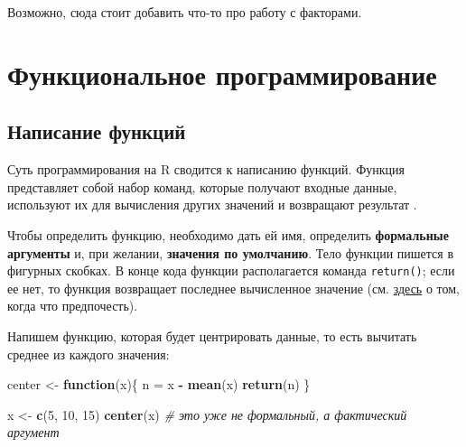 \documentclass[
]{book}
\newenvironment{Shaded}{\begin{snugshade}}{\end{snugshade}}
\newcommand{\CommentTok}[1]{\textcolor[rgb]{0.56,0.35,0.01}{\textit{#1}}}
\newcommand{\ControlFlowTok}[1]{\textcolor[rgb]{0.13,0.29,0.53}{\textbf{#1}}}
\newcommand{\DecValTok}[1]{\textcolor[rgb]{0.00,0.00,0.81}{#1}}
\newcommand{\FunctionTok}[1]{\textcolor[rgb]{0.13,0.29,0.53}{\textbf{#1}}}
\newcommand{\NormalTok}[1]{#1}
\newcommand{\OtherTok}[1]{\textcolor[rgb]{0.56,0.35,0.01}{#1}}
\newcommand{\SpecialCharTok}[1]{\textcolor[rgb]{0.81,0.36,0.00}{\textbf{#1}}}
\theoremstyle{definition}
\theoremstyle{definition}
\theoremstyle{definition}
\theoremstyle{definition}
\theoremstyle{remark}
\begin{document}
Возможно, сюда стоит добавить что-то про работу с факторами.

\hypertarget{ux444ux443ux43dux43aux446ux438ux43eux43dux430ux43bux44cux43dux43eux435-ux43fux440ux43eux433ux440ux430ux43cux43cux438ux440ux43eux432ux430ux43dux438ux435}{%
\chapter{Функциональное программирование}\label{ux444ux443ux43dux43aux446ux438ux43eux43dux430ux43bux44cux43dux43eux435-ux43fux440ux43eux433ux440ux430ux43cux43cux438ux440ux43eux432ux430ux43dux438ux435}}

\hypertarget{ux43dux430ux43fux438ux441ux430ux43dux438ux435-ux444ux443ux43dux43aux446ux438ux439}{%
\section{Написание функций}\label{ux43dux430ux43fux438ux441ux430ux43dux438ux435-ux444ux443ux43dux43aux446ux438ux439}}

Суть программирования на R сводится к написанию функций. Функция представляет собой набор команд, которые получают входные данные, используют их для вычисления других значений и возвращают результат \citep{мэтлофф2019}.

Чтобы определить функцию, необходимо дать ей имя, определить \textbf{формальные аргументы} и, при желании, \textbf{значения по умолчанию}. Тело функции пишется в фигурных скобках. В конце кода функции располагается команда \texttt{return()}; если ее нет, то функция возвращает последнее вычисленное значение (см. \href{https://r4ds.had.co.nz/functions.html}{здесь} о том, когда что предпочесть).

Напишем функцию, которая будет центрировать данные, то есть вычитать среднее из каждого значения:

\begin{Shaded}
\begin{Highlighting}[]
\NormalTok{center }\OtherTok{\textless{}{-}} \ControlFlowTok{function}\NormalTok{(x)\{ }
\NormalTok{  n }\OtherTok{=}\NormalTok{ x }\SpecialCharTok{{-}} \FunctionTok{mean}\NormalTok{(x)}
  \FunctionTok{return}\NormalTok{(n)}
\NormalTok{\}}

\NormalTok{x }\OtherTok{\textless{}{-}} \FunctionTok{c}\NormalTok{(}\DecValTok{5}\NormalTok{, }\DecValTok{10}\NormalTok{, }\DecValTok{15}\NormalTok{)}
\FunctionTok{center}\NormalTok{(x) }\CommentTok{\# это уже не формальный, а фактический аргумент}
\end{Highlighting}
\end{Shaded}
\end{document}

